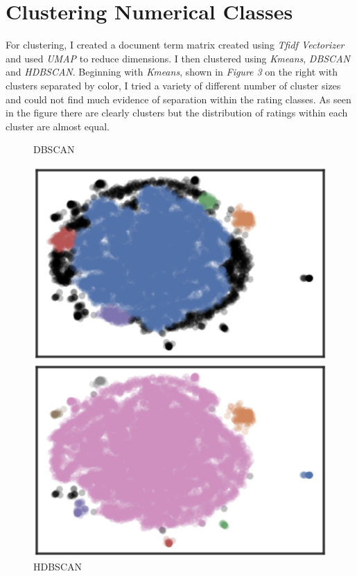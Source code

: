 \documentclass[a4paper, 11pt]{article}
\begin{document}
\section*{Clustering Numerical Classes}
\vspace{-1mm}
For clustering, I created a document term matrix created using \emph{Tfidf Vectorizer} and used \emph{UMAP} to reduce dimensions. I then clustered using \emph{Kmeans}, \emph{DBSCAN} and \emph{HDBSCAN}. Beginning with \emph{Kmeans}, shown in \emph{Figure 3} on the right with clusters separated by color, I tried a variety of different number of cluster sizes and could not find much evidence of separation within the rating classes. As seen in the figure there are clearly clusters but the distribution of ratings within each cluster are almost equal.

\begin{figure} %
    \centering
    \vspace{-4mm}
    \caption{DBSCAN}
    \includegraphics[width=\linewidth, trim=1 0 1 0,clip]{clusterdbscan.png}
    \vspace{-3mm}
    \caption{HDBSCAN}
    \includegraphics[width=\linewidth, trim=1 0 1 0,clip]{clusterhdbscan.png}
\end{figure}
\end{document}

